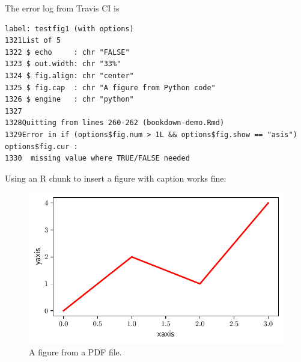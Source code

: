 \documentclass[]{book}
\newenvironment{Shaded}{\begin{snugshade}}{\end{snugshade}}
\newcommand{\NormalTok}[1]{#1}
\begin{document}
The error log from Travis CI is

\begin{verbatim}
label: testfig1 (with options) 
1321List of 5
1322 $ echo     : chr "FALSE"
1323 $ out.width: chr "33%"
1324 $ fig.align: chr "center"
1325 $ fig.cap  : chr "A figure from Python code"
1326 $ engine   : chr "python"
1327
1328Quitting from lines 260-262 (bookdown-demo.Rmd) 
1329Error in if (options$fig.num > 1L && options$fig.show == "asis") options$fig.cur : 
1330  missing value where TRUE/FALSE needed
\end{verbatim}

Using an R chunk to insert a figure with caption works fine:

\begin{Shaded}
\end{Shaded}

\begin{figure}

{\centering \includegraphics[width=0.33\linewidth]{img/testfig1} 

}

\caption{A figure from a PDF file.}\label{fig:testfig2}
\end{figure}
\end{document}
